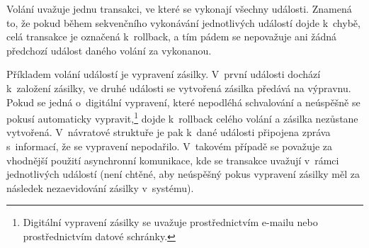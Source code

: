 \documentclass[
  master,
  field=ainfp,
  biblatex,
  language=czech,
  glossaries,
  theorems=false,
  index
]{kidiplom}
\begin{document}
Volání uvažuje jednu transakci, ve které se vykonají všechny události. Znamená to, že pokud během sekvenčního vykonávání jednotlivých událostí dojde k~chybě, celá transakce je označená k~rollback, a tím pádem se nepovažuje ani žádná předchozí událost daného volání za vykonanou.

\begin{table}
\begin{center}
\caption{Metody synchronního rozhraní}\label{tab:ErmsSync}
\end{center}
\end{table}

Příkladem volání událostí je vypravení zásilky. V~první události dochází k~založení zásilky, ve druhé události se vytvořená zásilka předává na výpravnu. Pokud se jedná o~digitální vypravení, které nepodléhá schvalování a neúspěšně se pokusí automaticky vypravit,\footnote{Digitální vypravení zásilky se uvažuje prostřednictvím e-mailu nebo prostřednictvím datové schránky.} dojde k~rollback celého volání a zásilka nezůstane vytvořená. V~návratové struktuře je pak k~dané události připojena zpráva s~informací, že se vypravení nepodařilo.
V~takovém případě se považuje za vhodnější použití asynchronní komunikace, kde se transakce uvažují v~rámci jednotlivých událostí (není chtěné, aby neúspěšný pokus vypravení zásilky měl za následek nezaevidování zásilky v~systému).
\end{document}
